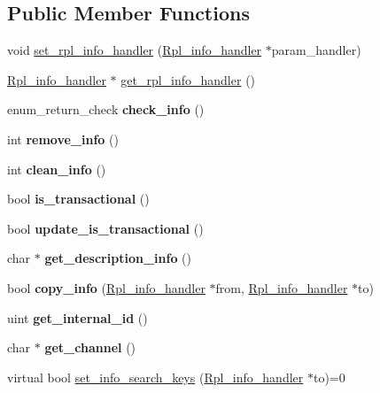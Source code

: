 \subsection*{Public Member Functions}
\begin{DoxyCompactItemize}
\item 
void \mbox{\hyperlink{classRpl__info_a1c4ec6f3b1db365afee63f16925144f4}{set\+\_\+rpl\+\_\+info\+\_\+handler}} (\mbox{\hyperlink{classRpl__info__handler}{Rpl\+\_\+info\+\_\+handler}} $\ast$param\+\_\+handler)
\item 
\mbox{\hyperlink{classRpl__info__handler}{Rpl\+\_\+info\+\_\+handler}} $\ast$ \mbox{\hyperlink{classRpl__info_a1fd496522e010306eaab144e69a4056f}{get\+\_\+rpl\+\_\+info\+\_\+handler}} ()
\item 
\mbox{\label{classRpl__info_ab8846f598534bbc8c42cdb629699c98f}} 
enum\+\_\+return\+\_\+check {\bfseries check\+\_\+info} ()
\item 
\mbox{\label{classRpl__info_a91f37106d849693896e0d615f1639539}} 
int {\bfseries remove\+\_\+info} ()
\item 
\mbox{\label{classRpl__info_aebfc5c391d493de3316791316c511150}} 
int {\bfseries clean\+\_\+info} ()
\item 
\mbox{\label{classRpl__info_a0013787650cdc0d3d0e432a2bd3b0a35}} 
bool {\bfseries is\+\_\+transactional} ()
\item 
\mbox{\label{classRpl__info_ab14e97b283d66a636e4220f4b39c33b7}} 
bool {\bfseries update\+\_\+is\+\_\+transactional} ()
\item 
\mbox{\label{classRpl__info_a8f82dffc76d7c297faaa4b0b6ed2d46f}} 
char $\ast$ {\bfseries get\+\_\+description\+\_\+info} ()
\item 
\mbox{\label{classRpl__info_a6f866844c1509312b74d56ac1343e5b9}} 
bool {\bfseries copy\+\_\+info} (\mbox{\hyperlink{classRpl__info__handler}{Rpl\+\_\+info\+\_\+handler}} $\ast$from, \mbox{\hyperlink{classRpl__info__handler}{Rpl\+\_\+info\+\_\+handler}} $\ast$to)
\item 
\mbox{\label{classRpl__info_a6adf0871b7679b618aef2e678d8ac144}} 
uint {\bfseries get\+\_\+internal\+\_\+id} ()
\item 
\mbox{\label{classRpl__info_af6e4d6b26233654c5c5e1813443da52d}} 
char $\ast$ {\bfseries get\+\_\+channel} ()
\item 
virtual bool \mbox{\hyperlink{classRpl__info_a0b3b3cf032e7017f1760379364ff1738}{set\+\_\+info\+\_\+search\+\_\+keys}} (\mbox{\hyperlink{classRpl__info__handler}{Rpl\+\_\+info\+\_\+handler}} $\ast$to)=0
\end{DoxyCompactItemize}

